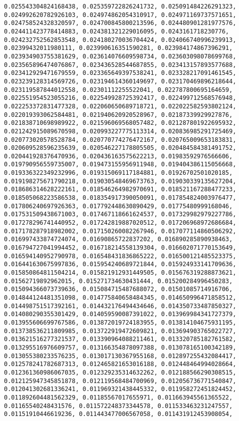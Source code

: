 \documentclass[11pt]{article}
\begin{document}
\begin{Verbatim}[commandchars=\\\{\}]
0.025543304824168438, 0.025359722826241732, 0.025091484226291323, 0.024992620782926103, 0.024974862054310917, 0.024971169737571651, 0.024758524328320597, 0.024700845800213596, 0.024480901281977576, 0.024411423778414883, 0.024381321229016095, 0.0243161718230776, 0.024232752562853548, 0.024180270036704424, 0.024066740996239913, 0.02399432011980111, 0.023990616351590281, 0.023984174867396291, 0.023934903755381629, 0.023614076609598734, 0.023603098078699768, 0.023565896474076867, 0.023436528544687855, 0.023413157893577688, 0.023412929471679559, 0.023365649397538241, 0.023328217091461545, 0.023239128314569726, 0.023194614360149697, 0.023170469896218644, 0.023119587844012558, 0.02301112255522041, 0.022787800695164659, 0.022551954523055216, 0.022549928725392417, 0.022499712568576948, 0.022253372831477328, 0.022060650689718721, 0.022022582593802124, 0.022019393062584481, 0.021940620920528967, 0.02187339929927876, 0.021838710698989922, 0.021596069568057482, 0.021287801922695932, 0.021242915089670598, 0.020993227775113314, 0.020836985291725469, 0.020773020578528784, 0.020770774276472167, 0.020765009653183831, 0.020609528596235639, 0.020546227178805505, 0.020484584381491752, 0.020441928376470936, 0.020436163575622213, 0.01983592976566606, 0.019790956559735007, 0.019473155956911948, 0.019404386115056668, 0.019336322349232996, 0.019315069117184881, 0.01926702501020185, 0.019198275671790218, 0.019030548469673763, 0.019030339135627204, 0.018686314628222161, 0.018546264982970691, 0.018521167288477233, 0.018505068223586538, 0.018354917390050091, 0.017854824003976477, 0.017806240697926363, 0.017792448630890429, 0.01775480999168046, 0.017531509438671003, 0.017467118661624537, 0.017329982979227786, 0.017278296741440952, 0.017242819887020512, 0.017206968972686684, 0.017178287918982002, 0.017150260082267946, 0.017077114860506292, 0.016997433874724074, 0.01690865722837202, 0.016890285890938463, 0.016794727041994452, 0.016718214558139304, 0.016602071770153649, 0.016594140952790978, 0.016548431836865222, 0.016500121485523375, 0.016441630675997836, 0.015954240689721844, 0.015924933141709636, 0.015850864811504214, 0.015821912931449505, 0.015676319288873621, 0.01562719892962015, 0.015271734630431444, 0.015200284996450283, 0.015094366073739636, 0.015084715487688072, 0.01501085714916706, 0.014844124481351098, 0.014775840658484345, 0.014650996471858512, 0.014498751517392161, 0.014432176494434646, 0.014350733487850327, 0.014080290355301429, 0.014059590087391022, 0.013969984341727379, 0.013955606699767586, 0.013872019724183955, 0.013814104675931195, 0.013738536211809985, 0.013722919472609821, 0.013694903765022727, 0.013621516277321537, 0.013390964088211461, 0.013320785182761582, 0.013295516976609757, 0.013166354878097388, 0.013078165100342189, 0.013055380233576235, 0.013017130367955168, 0.012897255432084417, 0.012578241782687313, 0.012465821653016188, 0.012448464994028664, 0.012361360986067035, 0.012329235314632262, 0.012188566290308515, 0.012125947345851878, 0.012119568484700969, 0.012056736771540847, 0.012041302681336241, 0.011969321438445332, 0.011958272451824452, 0.011892604481562329, 0.01185567017655971, 0.011663945561365522, 0.01165540248431576, 0.011572248373344578, 0.011533463231247557, 0.01151910446619236, 0.011443477006567058, 0.011431912453908054, 
\end{Verbatim}
\end{document}
